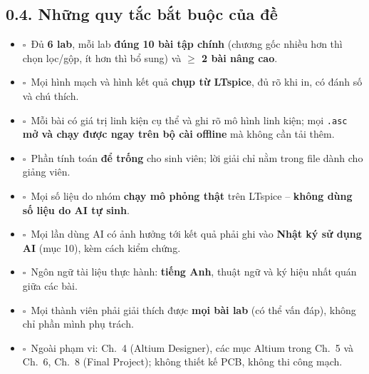 \documentclass[12pt,a4paper]{article}
\newif\ifguide
\newcommand{\cachlam}[2][Cách làm]{%
  \ifguide
  \begin{tcolorbox}[enhanced,breakable,colback=lightnavy,colframe=navy,boxrule=0.6pt,arc=2pt,
    left=6pt,right=6pt,top=3pt,bottom=3pt,fonttitle=\sffamily\bfseries\small,title={#1}]
  \small #2
  \end{tcolorbox}
  \fi}
\newcommand{\cb}{$\square$\ }
\begin{document}
\cachlam[Lưu ý quan trọng về định dạng báo cáo]{
Đề yêu cầu báo cáo theo mẫu Phần B ở dạng \textbf{.docx và .pdf}. File LaTeX này cho ra bản \textbf{.pdf}; hãy \textbf{hỏi giảng viên} xem có chấp nhận file nguồn \texttt{.tex} thay cho \texttt{.docx} đối với báo cáo hay không. Nếu không, chuyển nội dung sang mẫu \texttt{.docx} của đề (cấu trúc 12 mục giống hệt file này).}

\subsection*{0.4. Những quy tắc bắt buộc của đề}
\begin{itemize}
  \item \cb Đủ \textbf{6 lab}, mỗi lab \textbf{đúng 10 bài tập chính} (chương gốc nhiều hơn thì chọn lọc/gộp, ít hơn thì bổ sung) và \textbf{$\geq$ 2 bài nâng cao}.
  \item \cb Mọi hình mạch và hình kết quả \textbf{chụp từ LTspice}, đủ rõ khi in, có đánh số và chú thích.
  \item \cb Mỗi bài có giá trị linh kiện cụ thể và ghi rõ mô hình linh kiện; mọi \texttt{.asc} \textbf{mở và chạy được ngay trên bộ cài offline} mà không cần tải thêm.
  \item \cb Phần tính toán \textbf{để trống} cho sinh viên; lời giải chỉ nằm trong file dành cho giảng viên.
  \item \cb Mọi số liệu do nhóm \textbf{chạy mô phỏng thật} trên LTspice -- \textbf{không dùng số liệu do AI tự sinh}.
  \item \cb Mọi lần dùng AI có ảnh hưởng tới kết quả phải ghi vào \textbf{Nhật ký sử dụng AI} (mục 10), kèm cách kiểm chứng.
  \item \cb Ngôn ngữ tài liệu thực hành: \textbf{tiếng Anh}, thuật ngữ và ký hiệu nhất quán giữa các bài.
  \item \cb Mọi thành viên phải giải thích được \textbf{mọi bài lab} (có thể vấn đáp), không chỉ phần mình phụ trách.
  \item \cb Ngoài phạm vi: Ch.~4 (Altium Designer), các mục Altium trong Ch.~5 và Ch.~6, Ch.~8 (Final Project); không thiết kế PCB, không thi công mạch.
\end{itemize}
\end{document}
